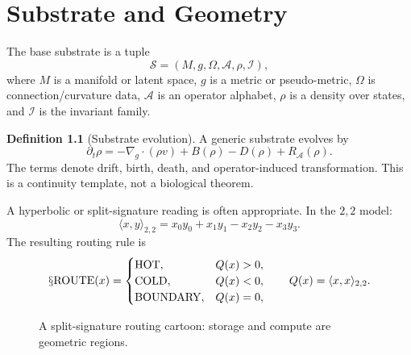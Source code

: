 \documentclass[11pt,oneside]{book}
\theoremstyle{definition}
\newtheorem{definition}{Definition}[chapter]
\theoremstyle{plain}
\theoremstyle{remark}
\newcommand{\Sop}[1]{\mathsection\mathrm{#1}}
\begin{document}
\chapter{Substrate and Geometry}

The base substrate is a tuple
\[
  \mathcal S=(M,g,\Omega,\mathcal A,\rho,\mathcal I),
\]
where \(M\) is a manifold or latent space, \(g\) is a metric or pseudo-metric,
\(\Omega\) is connection/curvature data, \(\mathcal A\) is an operator alphabet,
\(\rho\) is a density over states, and \(\mathcal I\) is the invariant family.

\begin{definition}[Substrate evolution]
A generic substrate evolves by
\[
\partial_t\rho
=-\nabla_g\cdot(\rho v)+B(\rho)-D(\rho)+R_{\mathcal A}(\rho).
\]
The terms denote drift, birth, death, and operator-induced transformation.  This is a
continuity template, not a biological theorem.
\end{definition}

A hyperbolic or split-signature reading is often appropriate.  In the \(2,2\) model:
\[
  \langle x,y\rangle_{2,2}=x_0y_0+x_1y_1-x_2y_2-x_3y_3.
\]
The resulting routing rule is
\[
\Sop{ROUTE}(x)=
\begin{cases}
\mathrm{HOT},& Q(x)>0,\\
\mathrm{COLD},& Q(x)<0,\\
\mathrm{BOUNDARY},& Q(x)=0,
\end{cases}
\qquad
Q(x)=\langle x,x\rangle_{2,2}.
\]

\begin{figure}[ht]
\centering
{}
\caption{A split-signature routing cartoon: storage and compute are geometric regions.}
\end{figure}
\end{document}
